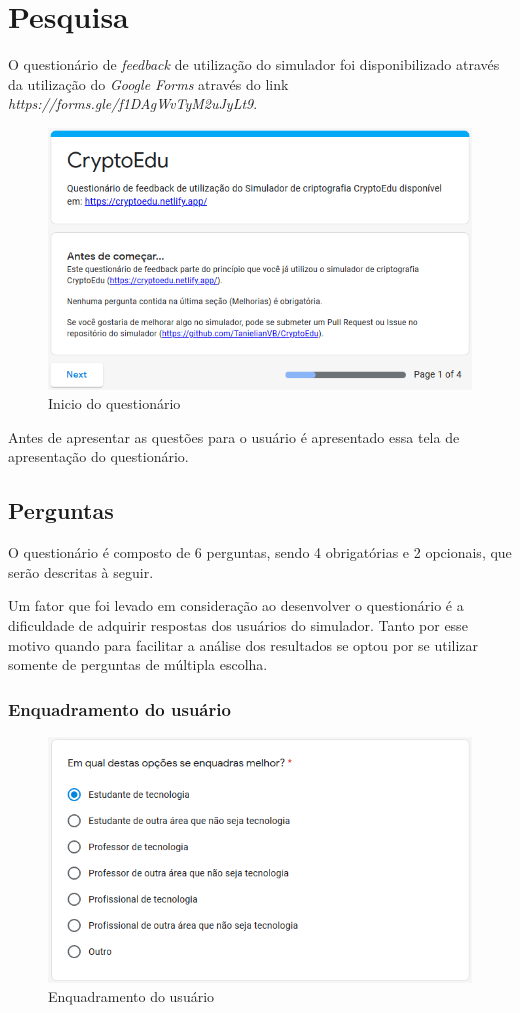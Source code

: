 \chapter{Pesquisa}
\label{char:pesquisa}
O questionário de \textit{feedback} de utilização do simulador foi disponibilizado através da utilização do \textit{Google Forms} através do link \textit{https://forms.gle/f1DAgWvTyM2uJyLt9}.

\begin{figure}[H]
    \centering
    \caption{Inicio do questionário}
    \includegraphics[width=0.75\linewidth]{Questionario/QI.png}
\end{figure}

Antes de apresentar as questões para o usuário é apresentado essa tela de apresentação do questionário.

\section{Perguntas}
O questionário é composto de 6 perguntas, sendo 4 obrigatórias e 2 opcionais, que serão descritas à seguir.

Um fator que foi levado em consideração ao desenvolver o  questionário é a dificuldade de adquirir respostas dos usuários do simulador. Tanto por esse motivo quando para facilitar a análise dos resultados se optou por se utilizar somente de perguntas de múltipla escolha.

\subsection{Enquadramento do usuário}

\begin{figure}[H]
    \centering
    \caption{Enquadramento do usuário}
    \includegraphics[width=0.75\linewidth]{Questionario/Q1.png}
\end{figure}

